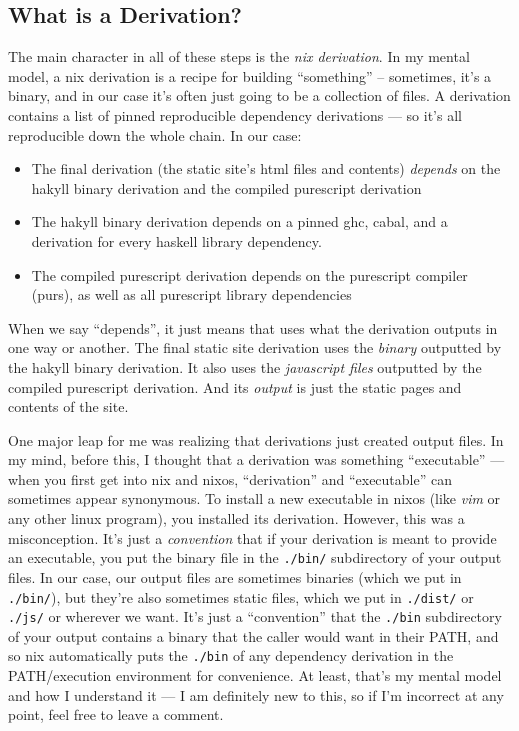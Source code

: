 \documentclass[]{article}
\begin{document}
\subsection{What is a Derivation?}\label{what-is-a-derivation}

The main character in all of these steps is the \emph{nix derivation}. In my
mental model, a nix derivation is a recipe for building ``something'' --
sometimes, it's a binary, and in our case it's often just going to be a
collection of files. A derivation contains a list of pinned reproducible
dependency derivations --- so it's all reproducible down the whole chain. In our
case:

\begin{itemize}
\tightlist
\item
  The final derivation (the static site's html files and contents)
  \emph{depends} on the hakyll binary derivation and the compiled purescript
  derivation
\item
  The hakyll binary derivation depends on a pinned ghc, cabal, and a derivation
  for every haskell library dependency.
\item
  The compiled purescript derivation depends on the purescript compiler (purs),
  as well as all purescript library dependencies
\end{itemize}

When we say ``depends'', it just means that uses what the derivation outputs in
one way or another. The final static site derivation uses the \emph{binary}
outputted by the hakyll binary derivation. It also uses the \emph{javascript
files} outputted by the compiled purescript derivation. And its \emph{output} is
just the static pages and contents of the site.

One major leap for me was realizing that derivations just created output files.
In my mind, before this, I thought that a derivation was something
``executable'' --- when you first get into nix and nixos, ``derivation'' and
``executable'' can sometimes appear synonymous. To install a new executable in
nixos (like \emph{vim} or any other linux program), you installed its
derivation. However, this was a misconception. It's just a \emph{convention}
that if your derivation is meant to provide an executable, you put the binary
file in the \texttt{./bin/} subdirectory of your output files. In our case, our
output files are sometimes binaries (which we put in \texttt{./bin/}), but
they're also sometimes static files, which we put in \texttt{./dist/} or
\texttt{./js/} or wherever we want. It's just a ``convention'' that the
\texttt{./bin} subdirectory of your output contains a binary that the caller
would want in their PATH, and so nix automatically puts the \texttt{./bin} of
any dependency derivation in the PATH/execution environment for convenience. At
least, that's my mental model and how I understand it --- I am definitely new to
this, so if I'm incorrect at any point, feel free to leave a comment.
\end{document}
